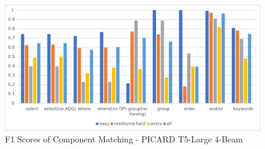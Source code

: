 

\begin{figure}[h]
    \centering
    \includegraphics[width=1\textwidth]{pics/ez/F1eps}
    \caption{F1 Scores of Component Matching - PICARD T5-Large 4-Beam}
\end{figure}
